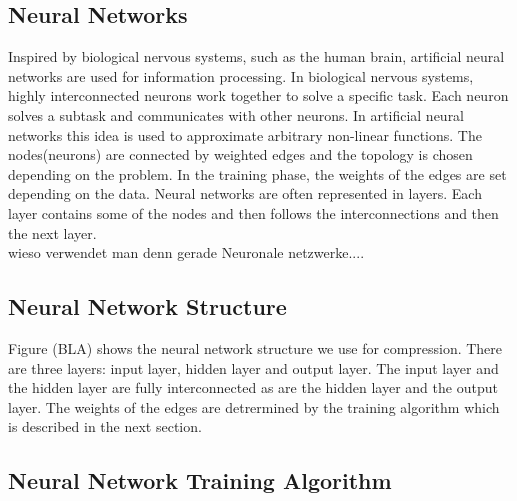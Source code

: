 \documentclass[10pt,conference,compsocconf]{IEEEtran}
\begin{document}
\subsection{Neural Networks}
Inspired by biological nervous systems, such as the human brain, artificial neural networks are used for information processing. In biological nervous systems, highly interconnected neurons work together to solve a specific task. Each neuron solves a subtask and communicates with other neurons. In artificial neural networks this idea is used to approximate arbitrary  non-linear functions. The nodes(neurons) are connected by weighted edges and the topology is chosen depending on the problem. In the training phase, the weights of the edges are set depending on the data. Neural networks are often represented in layers. Each layer contains some of the nodes and then follows the interconnections and then the next layer. 
\\
wieso verwendet man denn gerade Neuronale netzwerke....
\subsection{Neural Network Structure}
Figure (BLA) shows the neural network structure we use for compression. There are three layers: input layer, hidden layer and output layer. The input layer and the hidden layer are fully interconnected as are the hidden layer and the output layer. The weights of the edges are detrermined by the training algorithm which is described in the next section. 
\subsection{Neural Network Training Algorithm}
\end{document}
